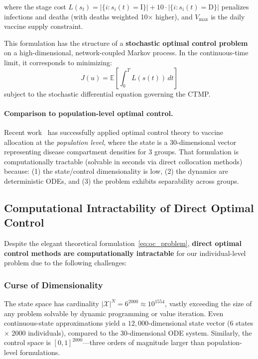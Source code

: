 where the stage cost $L(s_t) = |\{i : s_i(t) = \text{I}\}| + 10 \cdot |\{i : s_i(t) = \text{D}\}|$
penalizes infections and deaths (with deaths weighted 10× higher), and $V_{\max}$ is the
daily vaccine supply constraint.

This formulation has the structure of a \textbf{stochastic optimal control problem} on a
high-dimensional, network-coupled Markov process. In the continuous-time limit, it
corresponds to minimizing:
\begin{equation}
J(u) = \mathbb{E}\left[ \int_0^T L(s(t)) \, dt \right]
\end{equation}
subject to the stochastic differential equation governing the CTMP.

\paragraph{Comparison to population-level optimal control.}
Recent work~\citep{师兄论文} has successfully applied optimal control theory to
vaccine allocation at the \emph{population level}, where the state is a 30-dimensional
vector representing disease compartment densities for 3 groups. That formulation is
computationally tractable (solvable in seconds via direct collocation methods) because:
(1) the state/control dimensionality is low, (2) the dynamics are deterministic ODEs,
and (3) the problem exhibits separability across groups.

\subsection{Computational Intractability of Direct Optimal Control}
\label{sec:intractability}

Despite the elegant theoretical formulation~\eqref{eq:oc_problem}, \textbf{direct
optimal control methods are computationally intractable} for our individual-level
problem due to the following challenges:

\subsubsection{Curse of Dimensionality}

The state space has cardinality $|\mathcal{X}|^N = 6^{2000} \approx 10^{1554}$, vastly
exceeding the size of any problem solvable by dynamic programming or value iteration.
Even continuous-state approximations yield a $12{,}000$-dimensional state vector
(6 states $\times$ 2000 individuals), compared to the 30-dimensional ODE system.
Similarly, the control space is $[0,1]^{2000}$—three orders of magnitude larger than
population-level formulations.

